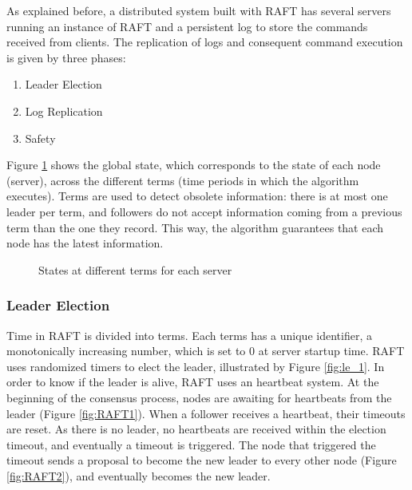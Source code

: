 \documentclass[12pt,a4paper]{article}
\begin{document}
As explained before, a distributed system built with RAFT has several servers running an instance of RAFT and a persistent log to store the commands received from clients. The replication of logs and consequent command execution is given by three phases:
\begin{enumerate}
    \item Leader Election
    \item Log Replication
    \item Safety
\end{enumerate}

Figure \ref{fig:state_empty} shows the global state, which corresponds to the state of each node (server), across the different terms (time periods in which the algorithm executes). Terms are used to detect obsolete information: there is at most one leader per term, and followers do not accept information coming from a previous term than the one they record. This way, the algorithm guarantees that each node has the latest information.

\begin{figure}
    \centering
    \qquad
    \caption{States at different terms for each server}%
    \label{fig:state_empty}%
\end{figure}
 


\subsubsection{Leader Election}
Time in RAFT is divided into terms. Each terms has a unique identifier, a monotonically increasing number, which is set to 0 at server startup time. RAFT uses randomized timers to elect the leader, illustrated by Figure  \ref{fig:le_1}. In order to know if the leader is alive, RAFT uses an heartbeat system. At the beginning of the consensus process, nodes are awaiting for heartbeats from the leader (Figure \ref{fig:RAFT1}). When a follower receives a heartbeat, their timeouts are reset. As there is no leader, no heartbeats are received within the election timeout, and eventually a timeout is triggered. The node that triggered the timeout sends a proposal to become the new leader to every other node (Figure \ref{fig:RAFT2}), and eventually becomes the new leader.
\end{document}
